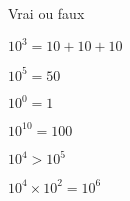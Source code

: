
Vrai ou faux

\begin{enumerate}
\begin{minipage}{0.49\linewidth}
\item $10^3=10 + 10 +10$
\item $10^5=50$
\item $10^0=1$ 
\end{minipage}
\hfill
\begin{minipage}{0.49\linewidth}
\item $10^{10}=100$
\item $10^{4}>10^5$ 
\item $10^4 \times 10^2 = 10^6$ 
\end{minipage}
\end{enumerate}